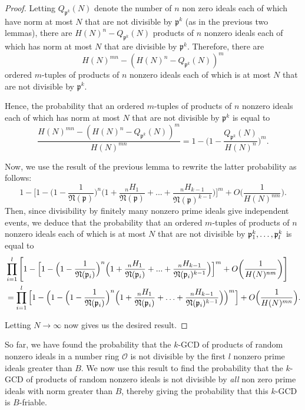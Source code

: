 \documentclass[10pt,a4paper]{article}
\theoremstyle{definition}
\theoremstyle{remark}
\newcommand{\f}[1]{\mathfrak{#1}}
\begin{document}
\begin{proof}
Letting $Q_{\f{p}^k}(N)$ denote the number of $n$ non zero ideals each of which have norm at most $N$ that are not divisible by $\f{p}^k$ (as in the previous two lemmas), there are $H(N)^n - Q_{\f{p}^k}(N)$ products of $n$ nonzero ideals each of which has norm at most $N$ that are divisible by $\f{p}^k$. Therefore, there are 
$$H(N)^{mn} - (H(N)^n - Q_{\f{p}^k}(N))^m$$
ordered $m$-tuples of products of $n$ nonzero ideals each of which is at most $N$ that are not divisible by $\f{p}^k$.

Hence, the probability that an ordered $m$-tuples of products of $n$ nonzero ideals each of which has norm at most $N$ that are not divisible by $\f{p}^k$ is equal to
$$\frac{H(N)^{mn} - (H(N)^n - Q_{\f{p}^k}(N))^m}{H(N)^{mn}} = 1 - \Big(1 - \frac{Q_{\f{p}^k}(N)}{H(N)^n}\Big)^m.$$

Now, we use the result of the previous lemma to rewrite the latter probability as follows:
$$1 - \Big[1 - \Big(1 - \frac{1}{\f{N}(\f{p})}\Big)^n \Big(1 + \frac{{}_nH_1}{\f{N}(\f{p})} + ... + \frac{{}_nH_{k-1}}{\f{N}(\f{p})^{k-1}}\Big)\Big]^m+O\bigg(\frac{1}{H(N)^{nm}}\bigg).$$
Then, since divisibility by finitely many nonzero prime ideals give independent events, we deduce that the probability that an ordered $m$-tuples of products of $n$ nonzero ideals each of which is at most $N$ that are not divisible by $\f{p}_1^k,\mathellipsis,\f{p}_l^k$ is equal to
\begin{align*} &\prod_{i=1}^l \Bigg[1 - \Big[1 - \Big(1 - \frac{1}{\f{N}(\f{p}_i)}\Big)^n \Big(1 + \frac{{}_nH_1}{\f{N}(\f{p}_i)} + ... + \frac{{}_nH_{k-1}}{\f{N}(\f{p}_i)^{k-1}}\Big)\Big]^m + O\bigg(\frac{1}{H(N)^{nm}}\bigg) \Bigg]\\
&=\prod_{i=1}^l \Big[1 - \Big(1 -\Big(1-\frac{1}{\f{N}(\f{p}_i)}\Big)^n\Big(1+\frac{{}_nH_1}{\f{N}(\f{p}_i)}+\mathellipsis+\frac{{}_nH_{k-1}}{\f{N}(\f{p}_i)^{k-1}}\Big)\Big)^m\Big] + O\Big(\frac{1}{H(N)^{mn}}\Big). \end{align*}
	
\noindent Letting $N \to \infty$ now gives us the desired result.
\end{proof}

So far, we have found the probability that the $k$-GCD of products of random nonzero ideals in a number ring $\mathcal{O}$ is not divisible by the first \(l\) nonzero prime ideals greater than \(B\). We now use this result to find the probability that the $k$-GCD of products of random nonzero ideals is not divisible by \textit{all} non zero prime ideals with norm greater than $B$, thereby giving the probability that this $k$-GCD is $B$-friable.


\end{document}
